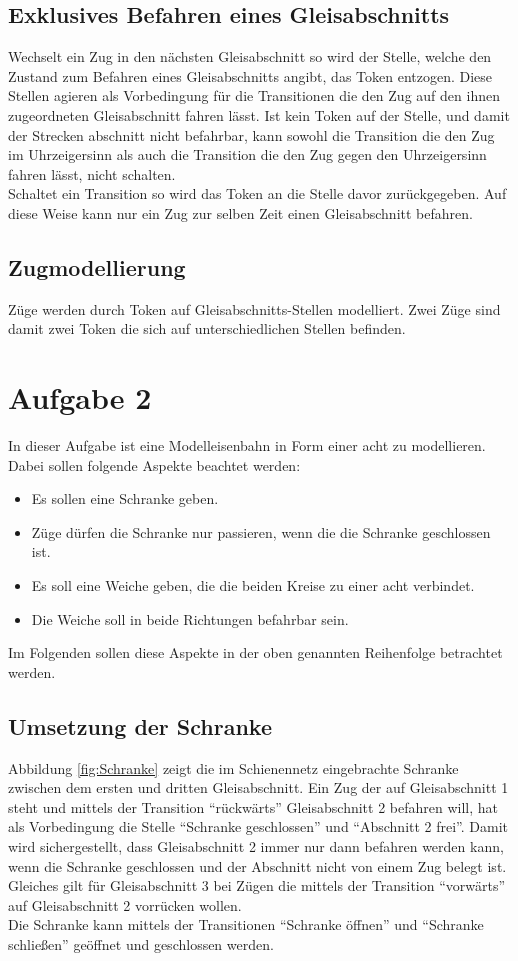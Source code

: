 \documentclass[10pt]{scrartcl}
\begin{document}
\subsection{Exklusives Befahren eines Gleisabschnitts}
Wechselt ein Zug in den nächsten Gleisabschnitt so wird der Stelle, welche den Zustand zum Befahren eines Gleisabschnitts angibt, das Token entzogen.
Diese Stellen agieren als Vorbedingung für die Transitionen die den Zug auf den ihnen zugeordneten Gleisabschnitt fahren lässt.
Ist kein Token auf der Stelle, und damit der Strecken abschnitt nicht befahrbar, kann sowohl die Transition die den Zug im Uhrzeigersinn als auch die Transition die den Zug gegen den Uhrzeigersinn fahren lässt, nicht schalten.\\
Schaltet ein Transition so wird das Token an die Stelle davor zurückgegeben.
Auf diese Weise kann nur ein Zug zur selben Zeit einen Gleisabschnitt befahren.

\subsection{Zugmodellierung}
Züge werden durch Token auf Gleisabschnitts-Stellen modelliert.
Zwei Züge sind damit zwei Token die sich auf unterschiedlichen Stellen befinden.

\section{Aufgabe 2}
In dieser Aufgabe ist eine Modelleisenbahn in Form einer acht zu modellieren.
Dabei sollen folgende Aspekte beachtet werden:
\begin{itemize}
	\item Es sollen eine Schranke geben.
	\item Züge dürfen die Schranke nur passieren, wenn die die Schranke geschlossen ist.
	\item Es soll eine Weiche geben, die die beiden Kreise zu einer acht verbindet.
	\item Die Weiche soll in beide Richtungen befahrbar sein.
\end{itemize}
Im Folgenden sollen diese Aspekte in der oben genannten Reihenfolge betrachtet werden.

\subsection{Umsetzung der Schranke}
Abbildung \ref{fig:Schranke} zeigt die im Schienennetz eingebrachte Schranke zwischen dem ersten und dritten Gleisabschnitt. Ein Zug der auf Gleisabschnitt 1 steht und mittels der Transition "`rückwärts"' Gleisabschnitt 2 befahren will, hat als Vorbedingung die Stelle "`Schranke geschlossen"' und "`Abschnitt 2 frei"'. Damit wird sichergestellt, dass Gleisabschnitt 2 immer nur dann befahren werden kann, wenn die Schranke geschlossen und der Abschnitt nicht von einem Zug belegt ist. Gleiches gilt für Gleisabschnitt 3 bei Zügen die mittels der Transition "`vorwärts"' auf Gleisabschnitt 2 vorrücken wollen.\\
Die Schranke kann mittels der Transitionen "`Schranke öffnen"' und "`Schranke schließen"' geöffnet und geschlossen werden.
 
\end{document}
